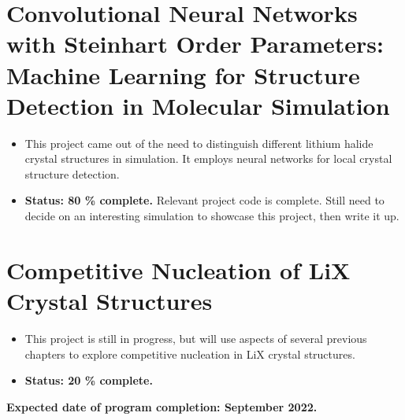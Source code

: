 \documentclass[titlepage,11pt]{article}
\begin{document}
\section{Convolutional Neural Networks with Steinhart Order Parameters: Machine Learning for Structure Detection in Molecular Simulation}

\begin{itemize}
	\item This project came out of the need to distinguish different lithium halide crystal structures in simulation. It employs neural networks for local crystal structure detection.
	\item \textbf{Status: 80 \% complete.} Relevant project code is complete. Still need to decide on an interesting simulation to showcase this project, then write it up.
\end{itemize}

\section{Competitive Nucleation of LiX Crystal Structures}

\begin{itemize}
	\item This project is still in progress, but will use aspects of several previous chapters to explore competitive nucleation in LiX crystal structures.
	\item \textbf{Status: 20 \% complete.} 
\end{itemize}

\textbf{Expected date of program completion: September 2022.}



%
%
\end{document}
